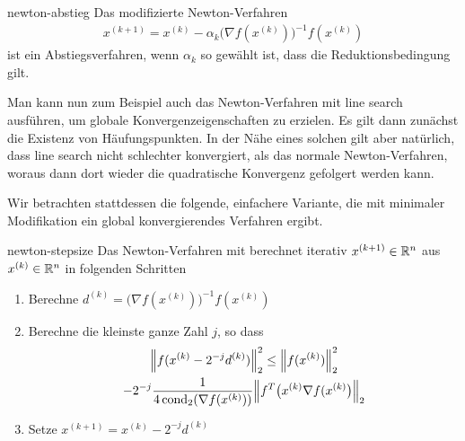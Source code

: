 \begin{Korollar}{newton-abstieg}
  Das modifizierte Newton-Verfahren
  \begin{gather}
    x^{(k+1)} = x^{(k)} - \alpha_k \bigl(\nabla f(x^{(k)})\bigr)^{-1} f(x^{(k)})
  \end{gather}
  ist ein Abstiegsverfahren, wenn $\alpha_k$ so gewählt ist, dass die
  Reduktionsbedingung gilt.
\end{Korollar}

\begin{remark}
  Man kann nun zum Beispiel auch das Newton-Verfahren mit line search
  ausführen, um globale Konvergenzeigenschaften zu erzielen. Es gilt
  dann zunächst die Existenz von Häufungspunkten. In der Nähe eines
  solchen gilt aber natürlich, dass line search nicht schlechter
  konvergiert, als das normale Newton-Verfahren, woraus dann dort
  wieder die quadratische Konvergenz gefolgert werden kann.

  Wir betrachten stattdessen die folgende, einfachere Variante, die
  mit minimaler Modifikation ein global konvergierendes Verfahren
  ergibt.
\end{remark}

\begin{Definition}{newton-stepsize}
  Das Newton-Verfahren mit  berechnet iterativ
  $x^{(k+1)}\in \mathbb R^n$ aus $x^{(k)}\in \mathbb R^n$ in folgenden Schritten
  \begin{enumerate}
  \item Berechne $d^{(k)} = \bigl(\nabla f(x^{(k)})\bigr)^{-1}f(x^{(k)})$
  \item Berechne die kleinste ganze Zahl $j$, so dass
    \begin{multline}
      \norm*{f(x^{(k)}-2^{-j} d^{(k)})}_2^2
      \le \norm*{f(x^{(k)})}_2^2
      \\- 2^{-j} \frac{1}{4\cond_2(\nabla f(x^{(k)}))}
      \norm*{f^T\bigl(x^{(k)}\nabla f(x^{(k)}\bigr)}_2
    \end{multline}
    \item Setze $x^{(k+1)}=x^{(k)}-2^{-j} d^{(k)}$
  \end{enumerate}
\end{Definition}

